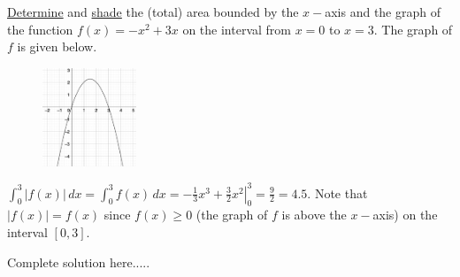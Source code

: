 \newpage
\begin{example}
\underline{Determine} and \underline{shade} the (total) area bounded by the $x-$axis and the graph of the function $f(x)=-x^2+3x$ on the interval from $x=0$ to $x=3$. The graph of $f$ is given below. 
\begin{figure}[h!]
        \includegraphics[width=0.25\textwidth,inner]{images/defIntgArea/areaEx1.png}
        \captionsetup{justification=justified, singlelinecheck=false}
        \label{fig:areaEx1}
\end{figure}
    \begin{sol}
    $\displaystyle\int_0^3 \bm{|}f(x)\bm{|}\,dx=\int_0^3 f(x)\,dx=\left.-\frac{1}{3}x^3+\frac{3}{2}x^2\right|_{0}^{3}= \frac{9}{2}=4.5$. Note that $\left|f(x)\right|=f(x)$ since $f(x)\ge 0$ (the graph of $f$ is above the $x-$axis) on the interval $[0,3]$.
    \end{sol}
    \begin{solL}
    Complete solution here.....
    
    \end{solL}
    
\end{example}

